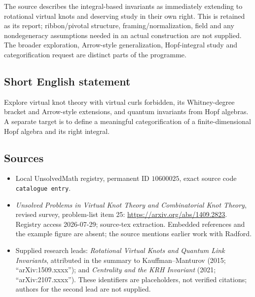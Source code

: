 \documentclass[11pt]{article}
\begin{document}
The source describes the integral-based invariants as immediately extending to rotational virtual knots and deserving study in their own right. This is retained as its report; ribbon/pivotal structure, framing/normalization, field and any nondegeneracy assumptions needed in an actual construction are not supplied. The broader exploration, Arrow-style generalization, Hopf-integral study and categorification request are distinct parts of the programme.
\subsection{Short English statement}
Explore virtual knot theory with virtual curls forbidden, its Whitney-degree bracket and Arrow-style extensions, and quantum invariants from Hopf algebras. A separate target is to define a meaningful categorification of a finite-dimensional Hopf algebra and its right integral.
\subsection{Sources}
\begin{itemize}
\item Local UnsolvedMath registry, permanent ID \(10600025\), exact source code \texttt{catalogue entry}.
\item \emph{Unsolved Problems in Virtual Knot Theory and Combinatorial Knot Theory}, revised survey, problem-list item 25: \url{https://arxiv.org/abs/1409.2823}. Registry access 2026-07-29; source-tex extraction. Embedded references and the example figure are absent; the source mentions earlier work with Radford.
\item Supplied research leads: \emph{Rotational Virtual Knots and Quantum Link Invariants}, attributed in the summary to Kauffman--Manturov (2015; ``arXiv:1509.xxxx''); and \emph{Centrality and the KRH Invariant} (2021; ``arXiv:2107.xxxx''). These identifiers are placeholders, not verified citations; authors for the second lead are not supplied.
\end{itemize}
\end{document}
